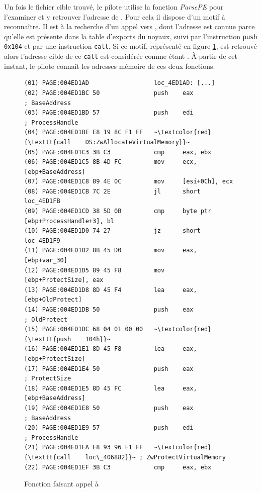 Un fois le fichier cible trouvé, le pilote utilise la fonction \emph{ParsePE} pour l'examiner et y retrouver l'adresse de \ZwP.
Pour cela il dispose d'un motif à reconnaître.
Il est à la recherche d'un appel vers \ZwA, dont l'adresse est connue parce qu'elle est présente dans la table d'exports du noyaux, suivi par l'instruction \texttt{push 0x104} et par une instruction \texttt{call}.
Si ce motif, représenté en figure \ref{fig:CallZwProtect}, est retrouvé alors l'adresse cible de ce \texttt{call} est considérée comme étant \ZwP.
À partir de cet instant, le pilote connaît les adresses mémoire de ces deux fonctions.

\begin{figure}[h]
\scriptsize
\begin{lstlisting}[language={[x86masm]Assembler}, escapechar=~]
(01) PAGE:004ED1AD                  loc_4ED1AD: [...]                      
(02) PAGE:004ED1BC 50               push    eax             ; BaseAddress
(03) PAGE:004ED1BD 57               push    edi             ; ProcessHandle
(04) PAGE:004ED1BE E8 19 8C F1 FF   ~\textcolor{red}{\texttt{call    DS:ZwAllocateVirtualMemory}}~
(05) PAGE:004ED1C3 3B C3            cmp     eax, ebx
(06) PAGE:004ED1C5 8B 4D FC         mov     ecx, [ebp+BaseAddress]
(07) PAGE:004ED1C8 89 4E 0C         mov     [esi+0Ch], ecx
(08) PAGE:004ED1CB 7C 2E            jl      short loc_4ED1FB
(09) PAGE:004ED1CD 38 5D 0B         cmp     byte ptr [ebp+ProcessHandle+3], bl
(10) PAGE:004ED1D0 74 27            jz      short loc_4ED1F9
(11) PAGE:004ED1D2 8B 45 D0         mov     eax, [ebp+var_30]
(12) PAGE:004ED1D5 89 45 F8         mov     [ebp+ProtectSize], eax
(13) PAGE:004ED1D8 8D 45 F4         lea     eax, [ebp+OldProtect]
(14) PAGE:004ED1DB 50               push    eax             ; OldProtect
(15) PAGE:004ED1DC 68 04 01 00 00   ~\textcolor{red}{\texttt{push    104h}}~
(16) PAGE:004ED1E1 8D 45 F8         lea     eax, [ebp+ProtectSize]
(17) PAGE:004ED1E4 50               push    eax             ; ProtectSize
(18) PAGE:004ED1E5 8D 45 FC         lea     eax, [ebp+BaseAddress]
(19) PAGE:004ED1E8 50               push    eax             ; BaseAddress
(20) PAGE:004ED1E9 57               push    edi             ; ProcessHandle
(21) PAGE:004ED1EA E8 93 96 F1 FF   ~\textcolor{red}{\texttt{call    loc\_406882}}~ ; ZwProtectVirtualMemory
(22) PAGE:004ED1EF 3B C3            cmp     eax, ebx
\end{lstlisting}
\caption{Fonction faisant appel à \ZwP\label{fig:CallZwProtect}}
\end{figure}

